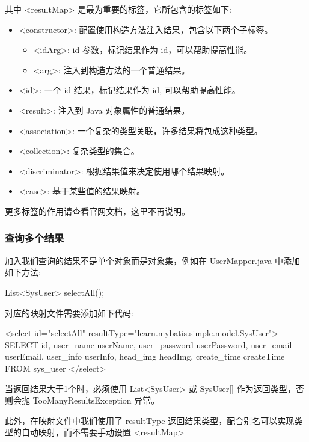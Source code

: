 其中 <resultMap> 是最为重要的标签，它所包含的标签如下:
\begin{itemize}
    \item <constructor>: 配置使用构造方法注入结果，包含以下两个子标签。
    \begin{itemize}
        \item <idArg>: id 参数，标记结果作为 id，可以帮助提高性能。
        \item <arg>: 注入到构造方法的一个普通结果。
    \end{itemize}
    \item <id>: 一个 id 结果，标记结果作为 id, 可以帮助提高性能。
    \item <result>: 注入到 Java 对象属性的普通结果。
    \item <association>: 一个复杂的类型关联，许多结果将包成这种类型。
    \item <collection>: 复杂类型的集合。
    \item <discriminator>: 根据结果值来决定使用哪个结果映射。
    \item <case>: 基于某些值的结果映射。
\end{itemize}

更多标签的作用请查看官网文档，这里不再说明。

\subsubsection{查询多个结果}

加入我们查询的结果不是单个对象而是对象集，例如在 UserMapper.java 中添加如下方法:

\begin{Java}
List<SysUser> selectAll();
\end{Java}

对应的映射文件需要添加如下代码:

\begin{xml}
<select id="selectAll" resultType="learn.mybatis.simple.model.SysUser">
    SELECT id,
           user_name     userName,
           user_password userPassword,
           user_email    userEmail,
           user_info     userInfo,
           head_img      headImg,
           create_time   createTime
    FROM sys_user
</select>
\end{xml}

当返回结果大于1个时，必须使用 List<SysUser> 或 SysUser[] 作为返回类型，否则会抛 TooManyResultsException 异常。 

此外，在映射文件中我们使用了 resultType 返回结果类型，配合别名可以实现类型的自动映射，而不需要手动设置 <resultMap>

